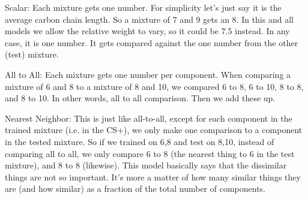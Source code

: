 Scalar: Each mixture gets one number.  For simplicity let's just say it is the average carbon chain length.  So a mixture of 7 and 9 gets an 8.  In this and all models we allow the relative weight to vary, so it could be 7.5 instead.  In any case, it is one number.  It gets compared against the one number from the other (test) mixture.  

All to All: Each mixture gets one number per component.  When comparing a mixture of 6 and 8 to a mixture of 8 and 10, we compared 6 to 8, 6 to 10, 8 to 8, and 8 to 10.  In other words, all to all comparison.  Then we add these up.  

Nearest Neighbor: This is just like all-to-all, except for each component in the trained mixture (i.e. in the CS+), we only make one comparison to a component in the tested mixture.  So if we trained on 6,8 and test on 8,10, instead of comparing all to all, we only compare 6 to 8 (the nearest thing to 6 in the test mixture), and 8 to 8 (likewise).  This model basically says that the dissimilar things are not so important.  It's more a matter of how many similar things they are (and how similar) as a fraction of the total number of components.  